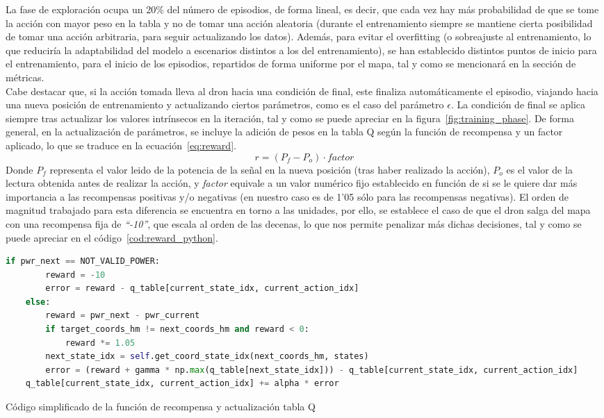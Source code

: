 La fase de exploración ocupa un 20\% del número de episodios, de forma lineal, es decir, que cada vez hay más probabilidad de que se tome la acción con mayor peso en la tabla y no de tomar una acción aleatoria (durante el entrenamiento siempre se mantiene cierta posibilidad de tomar una acción arbitraria, para seguir actualizando los datos). Además, para evitar el overfitting (o sobreajuste al entrenamiento, lo que reduciría la adaptabilidad del modelo a escenarios distintos a los del entrenamiento), se han establecido distintos puntos de inicio para el entrenamiento, para el inicio de los episodios, repartidos de forma uniforme por el mapa, tal y como se mencionará en la sección de métricas.\\

Cabe destacar que, si la acción tomada lleva al dron hacia una condición de final, este finaliza automáticamente el episodio, viajando hacia una nueva posición de entrenamiento y actualizando ciertos parámetros, como es el caso  del parámetro $\epsilon$. La condición de final se aplica siempre tras actualizar los valores intrínsecos en la iteración, tal y como se puede apreciar en la figura~\ref{fig:training_phase}. De forma general, en la actualización de parámetros, se incluye la adición de pesos en la tabla Q según la función de recompensa y un factor aplicado, lo que se traduce en la ecuación~\ref{eq:reward}.
\begin{equation}
    r = (P_f - P_o) \cdot factor
    \label{eq:reward}
\end{equation}
Donde $P_f$ representa el valor leido de la potencia de la señal en la nueva posición (tras haber realizado la acción), $P_o$ es el valor de la lectura obtenida antes de realizar la acción, y \emph{factor} equivale a un valor numérico fijo establecido en función de si se le quiere dar más importancia a las recompensas positivas y/o negativas (en nuestro caso es de 1'05 sólo para las recompensas negativas). El orden de magnitud trabajado para esta diferencia se encuentra en torno a las unidades, por ello, se establece el caso de que el dron salga del mapa con una recompensa fija de \emph{``-10''}, que escala al orden de las decenas, lo que nos permite penalizar más dichas decisiones, tal y como se puede apreciar en el código~\ref{cod:reward_python}.

\begin{code}[hp]
    \begin{lstlisting}[language=Python]
    if pwr_next == NOT_VALID_POWER:
        reward = -10
        error = reward - q_table[current_state_idx, current_action_idx]
    else:
        reward = pwr_next - pwr_current
        if target_coords_hm != next_coords_hm and reward < 0:
            reward *= 1.05
        next_state_idx = self.get_coord_state_idx(next_coords_hm, states)
        error = (reward + gamma * np.max(q_table[next_state_idx])) - q_table[current_state_idx, current_action_idx]
    q_table[current_state_idx, current_action_idx] += alpha * error
    \end{lstlisting}
    \caption[Código simplificado de la función de recompensa y actualización tabla Q]{Código simplificado de la función de recompensa y actualización tabla Q}
    \label{cod:reward_python}
\end{code}

